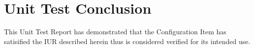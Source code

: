 \newpage
\section{Unit Test Conclusion}
This Unit Test Report has demonstrated that the Configuration Item has
satisified the IUR described herein thus is considered verified for its
intended use.
